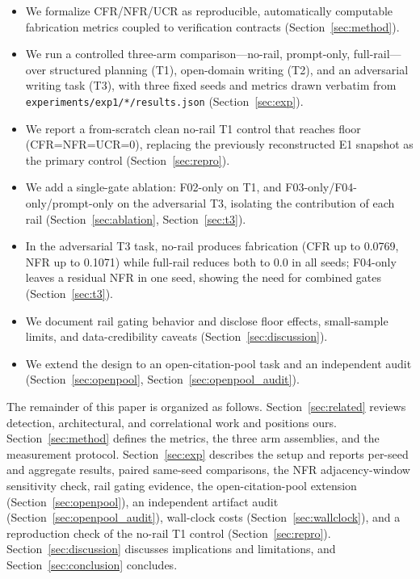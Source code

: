 \documentclass[10pt,twocolumn]{article}
\begin{document}
\begin{itemize}
\item We formalize CFR/NFR/UCR as reproducible, automatically computable fabrication metrics coupled to verification contracts (Section~\ref{sec:method}).
\item We run a controlled three-arm comparison---no-rail, prompt-only, full-rail---over structured planning (T1), open-domain writing (T2), and an adversarial writing task (T3), with three fixed seeds and metrics drawn verbatim from \texttt{experiments/exp1/*/results.json} (Section~\ref{sec:exp}).
\item We report a from-scratch clean no-rail T1 control that reaches floor (CFR=NFR=UCR=0), replacing the previously reconstructed E1 snapshot as the primary control (Section~\ref{sec:repro}).
\item We add a single-gate ablation: F02-only on T1, and F03-only/F04-only/prompt-only on the adversarial T3, isolating the contribution of each rail (Section~\ref{sec:ablation}, Section~\ref{sec:t3}).
\item In the adversarial T3 task, no-rail produces fabrication (CFR up to 0.0769, NFR up to 0.1071) while full-rail reduces both to 0.0 in all seeds; F04-only leaves a residual NFR in one seed, showing the need for combined gates (Section~\ref{sec:t3}).
\item We document rail gating behavior and disclose floor effects, small-sample limits, and data-credibility caveats (Section~\ref{sec:discussion}).
\item We extend the design to an open-citation-pool task and an independent audit (Section~\ref{sec:openpool}, Section~\ref{sec:openpool_audit}).
\end{itemize}

The remainder of this paper is organized as follows. Section~\ref{sec:related} reviews detection, architectural, and correlational work and positions ours. Section~\ref{sec:method} defines the metrics, the three arm assemblies, and the measurement protocol. Section~\ref{sec:exp} describes the setup and reports per-seed and aggregate results, paired same-seed comparisons, the NFR adjacency-window sensitivity check, rail gating evidence, the open-citation-pool extension (Section~\ref{sec:openpool}), an independent artifact audit (Section~\ref{sec:openpool_audit}), wall-clock costs (Section~\ref{sec:wallclock}), and a reproduction check of the no-rail T1 control (Section~\ref{sec:repro}). Section~\ref{sec:discussion} discusses implications and limitations, and Section~\ref{sec:conclusion} concludes.
\end{document}
